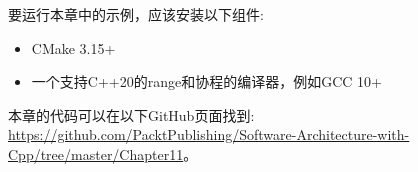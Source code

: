 
要运行本章中的示例，应该安装以下组件:

\begin{itemize}
\item 
CMake 3.15+

\item 
一个支持C++20的range和协程的编译器，例如GCC 10+
\end{itemize}

本章的代码可以在以下GitHub页面找到: \url{https://github.com/PacktPublishing/Software-Architecture-with-Cpp/tree/master/Chapter11}。